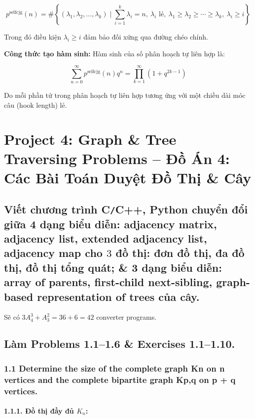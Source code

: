\documentclass{article}
\begin{document}
\begin{itemize}
		\[
		p^{\text{selfcjg}}(n) = \# \left\{ (\lambda_1, \lambda_2, \dots, \lambda_k) \mid \sum_{i=1}^k \lambda_i = n,\ \lambda_i \text{ lẻ},\ \lambda_1 \geq \lambda_2 \geq \cdots \geq \lambda_k,\ \lambda_i \geq i \right\}
		\]
		
		Trong đó điều kiện \( \lambda_i \geq i \) đảm bảo đối xứng qua đường chéo chính.
		
		\textbf{Công thức tạo hàm sinh:} Hàm sinh của số phân hoạch tự liên hợp là:
		
		\[
		\sum_{n=0}^\infty p^{\text{selfcjg}}(n) q^n = \prod_{k=1}^\infty (1 + q^{2k-1})
		\]
		
		Do mỗi phần tử trong phân hoạch tự liên hợp tương ứng với một chiều dài móc câu (hook length) lẻ.
		
		
	\end{itemize}
	
	\section*{Project 4: Graph \& Tree Traversing Problems -- Đồ Án 4: Các Bài Toán Duyệt Đồ Thị \& Cây}
	
	\subsection*{Viết chương trình {\sf C{\tt/}C++, Python} chuyển đổi giữa 4 dạng biểu diễn: adjacency matrix, adjacency list, extended adjacency list, adjacency map cho $3$ đồ thị: đơn đồ thị, đa đồ thị, đồ thị tổng quát; \& 3 dạng biểu diễn: array of parents, first-child next-sibling, graph-based representation of trees của cây.}
	
	Sẽ có $3A_4^3 + A_3^2 = 36 + 6 = 42$ converter programs.

	\subsection*{Làm Problems 1.1--1.6 \& Exercises 1.1--1.10.}
	
	\subsubsection*{1.1  Determine the size of the complete graph Kn on n vertices and the complete bipartite graph Kp,q on p + q vertices.}
	
	\paragraph*{1.1.1. Đồ thị đầy đủ \( K_n \):}
	
\end{document}
